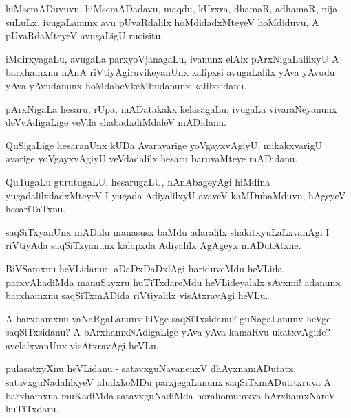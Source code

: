 \documentclass{article}
\begin{document}
\begin{mn}%
hiMsemADuvuvu, hiMsemADadavu, maqdu, kUrxra, dhamaR, adhamaR, nija,
suLuLx, ivugaLanunx avu pUvaRdalilx hoMdidadxMteyeV hoMdiduvu, A
pUvaRdaMteyeV avugaLigU rucisitu.
\end{mn}

\begin{mn}
iMdirxyagaLu, avugaLa parxyoVjanagaLu, ivanunx elAlx pArxNigaLalilxyU
A barxhamxnu nAnA riVtiyAgiruvikeyanUnx kalipxsi avugaLalilx yAva
yAvudu yAva yAvudanunx hoMdabeVkeMbudanunx kalilxsidanu.
\end{mn}

\begin{mn}
pArxNigaLa hesaru, rUpa, mADatakakx kelasagaLu, ivugaLa vivaraNeyanunx
deVvAdigaLige veVda shabadxdiMdaleV mADidanu.
\end{mn}

\begin{mn}
QuSigaLige hesaranUnx kUDa Avaravarige yoVgayxvAgiyU, mikakxvarigU
avarige yoVgayxvAgiyU veVdadalilx hesaru baruvaMteye mADidanu.
\end{mn}

\begin{mn}
QuTugaLu gurutugaLU, hesarugaLU, nAnAbageyAgi hiMdina
yugadalilxdadxMteyeV I yugada AdiyalilxyU avaveV kaMDubaMduvu, hAgeyeV hesariTaTxnu.
\end{mn}

\begin{mn}%
saqSiTxyanUnx mADalu manasusx baMdu adaralilx shakitxyuLaLxvanAgi I
riVtiyAda saqSiTxyanunx kalapxda Adiyalilx AgAgeyx mADutAtxne.
\end{mn}

\begin{mn}
BiVSamxnu heVLidanu:- aDaDxDaDxlAgi hariduveMdu heVLida parxvAhadiMda
manuSayxru huTiTxdareMdu heVLideyalalx sAvxmi! adanunx barxhamxnu
saqSiTxmADida riVtiyalilx visAtxravAgi heVLu.
\end{mn}

\begin{mn}
A barxhamxnu vaNaRgaLanunx hiVge saqSiTxsidanu? guNagaLanunx heVge
saqSiTxsidanu? A bArxhamxNAdigaLige yAva yAva kamaRvu ukatxvAgide?
avelalxvanUnx visAtxravAgi heVLu.
\end{mn}

\begin{mn}
pulasatxyXnu heVLidanu:- satavxguNavanenxV
dhAyxnamADutatx. satavxguNadalilxyeV idudxkoMDu parxjegaLanunx
saqSiTxmADutitxruva A barxhamxna muKadiMda satavxguNadiMda
horahomumxva bArxhamxNareV huTiTxdaru.
\end{mn}
\end{document}
